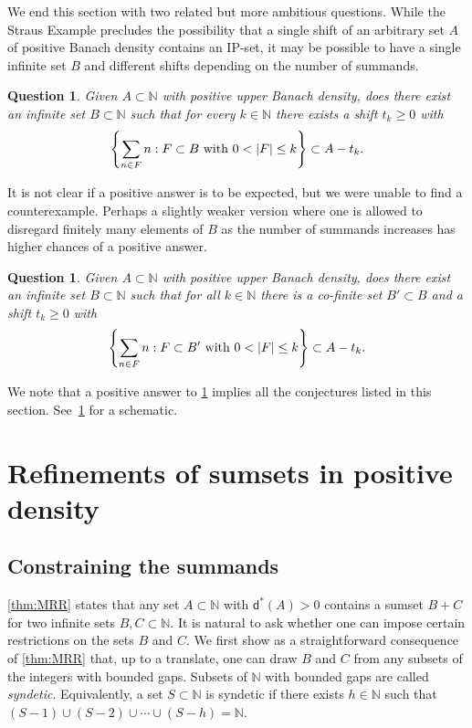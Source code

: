 \documentclass[10pt,dvipsnames]{article}
\newtheorem{question}[theorem]{Question}
\theoremstyle{definition}
\theoremstyle{plain}
\newcommand{\define}[1]{\textit{#1}}
\newcommand{\N}{\mathbb{N}}
\newcommand{\ubdens}{\mathsf{d}^*}
\begin{document}
We end this section with two related but more ambitious questions. 
While the Straus Example precludes the possibility that a single shift of an arbitrary set $A$ of positive Banach density contains an IP-set, it may be possible to have a single infinite set $B$ and different shifts depending on the number of summands.

\begin{question}\label{question_motherHindman}
Given $A\subset\N$ with positive upper Banach density, does there exist an infinite set $B \subset\N$ such that for every $k\in\N$ there exists a shift $t_k\geq0$ with
\[\left\{ \sum_{n \in F}  n :   F \subset B\textup{ with } 0< |F| \leq k \right\}\subset A-t_k. \]
\end{question}
It is not clear if a positive answer is to be expected, but we were unable to find a counterexample.
Perhaps a slightly weaker version where one is allowed to disregard finitely many elements of $B$ as the number of summands increases has higher chances of a positive answer.
\begin{question}\label{question_sameB}
Given $A\subset\N$ with positive upper Banach density, does there exist an infinite set $B \subset\N$ such that for all $k\in\N$ there is a co-finite set $B'\subset B$ and a shift $t_k\geq0$ with
\[\left\{ \sum_{n \in F}  n :   F \subset B'\textup{ with } 0< |F| \leq k \right\}\subset A-t_k. 
\]
\end{question}

We note that a positive answer to \cref{question_motherHindman} implies all the conjectures listed in this section. See~\cref{fig:diagram} for a schematic.




\begin{figure}[omitted: a diagram of this paper's results, not reproduced here]\label{fig:diagram}\end{figure}




\section{Refinements of sumsets in positive density}
\label{sec:refinements}



\subsection{Constraining the summands}

\cref{thm:MRR} states that any set $A\subset\N$ with $\ubdens(A)>0$ contains a sumset $B+C$ for two infinite sets $B,C\subset\N$.
It is natural to ask whether one can impose certain restrictions on the sets $B$ and $C$.
We first show as a straightforward consequence of \cref{thm:MRR} that, up to a translate, one can draw $B$ and $C$ from any subsets of the integers with bounded gaps. 
Subsets of $\N$ with bounded gaps are called \define{syndetic}. 
Equivalently, a set $S \subset \N$ is syndetic if there exists $h\in\N$ such that $(S-1) \cup (S-2) \cup \cdots \cup (S-h) = \N$.
\end{document}

